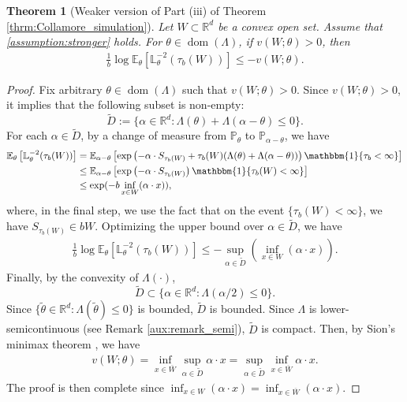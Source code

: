 \documentclass[aap,preprint]{imsart}
\newcommand{\Pro}{{\mathbb{P}}}
\newcommand{\Exp}{{\mathbb{E}}}
\newcommand{\bR}{{\mathbb{R}}}
\theoremstyle{plain}
\newtheorem{theorem}{Theorem}[section]
\theoremstyle{definition}
\begin{document}
\begin{appendix}
\begin{theorem}[Weaker version of Part (iii) of Theorem \ref{thrm:Collamore_simulation}]\label{app:thrm_weaker_simulation}
Let $W \subset \mathbb{R}^d$ be a convex open set. 
 Assume  that \eqref{assumption:stronger} holds.
  For $\theta \in \operatorname{dom}(\Lambda)$, if  $v(W;\theta) > 0$, then
\begin{align*}
    \frac{1}{b} \log \Exp_{\theta}\left[ 
\mathbb{L}_{\theta}^{-2}(\tau_b(W))
\right] \leq   - v(W;\theta).
\end{align*}
\end{theorem}
\begin{proof}
Fix arbitrary $\theta \in \operatorname{dom}(\Lambda)$ such that  $v(W;\theta) > 0$. 
Since $v(W;\theta) > 0$, it implies that the following subset is non-empty:
$$
\widetilde{D} := \{\alpha \in \bR^d: \Lambda(\theta) + \Lambda(\alpha - \theta) \leq 0\}.
$$
For each $\alpha \in \widetilde{D}$,
by a change of measure from $\Pro_{\theta}$ to $\Pro_{ \alpha - \theta}$, we have
\begin{align*}
    \Exp_{\theta}\left[ 
\mathbb{L}_{\theta}^{-2}(\tau_b(W))
\right] &=  \Exp_{\alpha -\theta }\left[ 
\exp\left(-\alpha  \cdot S_{\tau_b(W)} + \tau_b(W)(\Lambda(\theta) +\Lambda(\alpha - \theta))\right)
\mathbbm{1}\{\tau_b < \infty\} 
\right] \\
&\leq \Exp_{\alpha -\theta }\left[ 
\exp\left(-\alpha  \cdot S_{\tau_b(W)}  \right)
\mathbbm{1}\{\tau_b(W) < \infty\} 
\right] \\
&\leq \exp(-b \inf_{x \in W} (\alpha \cdot x)),
\end{align*}
where, in the final step, we use the fact that on the event $\{\tau_b(W) < \infty\}$, we have $S_{\tau_b(W)} \in bW$. Optimizing the upper bound over $\alpha \in \widetilde{D}$, we have
\begin{align*}
    \frac{1}{b}\log\Exp_{\theta}\left[ 
\mathbb{L}_{\theta}^{-2}(\tau_b(W))
\right]  \leq - \sup_{\alpha \in \tilde{D}} \left(\inf_{x \in W} (\alpha \cdot x)\right).
\end{align*}
Finally, by the convexity of $\Lambda(\cdot)$,
$$
\widetilde{D} \subset \{\alpha \in \bR^{d}: \Lambda(\alpha/2) \leq 0\}.
$$
Since $\{\tilde{\theta} \in \bR^{d}: \Lambda(\tilde{\theta}) \leq 0\}$ is bounded, 
$\widetilde{D}$ is bounded. Since $\Lambda$ is lower-semicontinuous (see Remark \ref{aux:remark_semi}), $\widetilde{D}$ is compact.  Then, by Sion's minimax theorem \citep{sion1958minimax}, we have
\begin{align*}%
    v(W;\theta) = \inf_{x \in \overline{W}} \sup_{\alpha \in \widetilde{D}} \alpha \cdot x =   \sup_{\alpha \in \widetilde{D}} \inf_{x \in \overline{W}} \alpha \cdot x.
\end{align*}
The proof is then complete since $\inf_{x \in W} (\alpha \cdot x) = \inf_{x \in \overline{W}} (\alpha \cdot x)$.
\end{proof}


\end{appendix}
\end{document}
